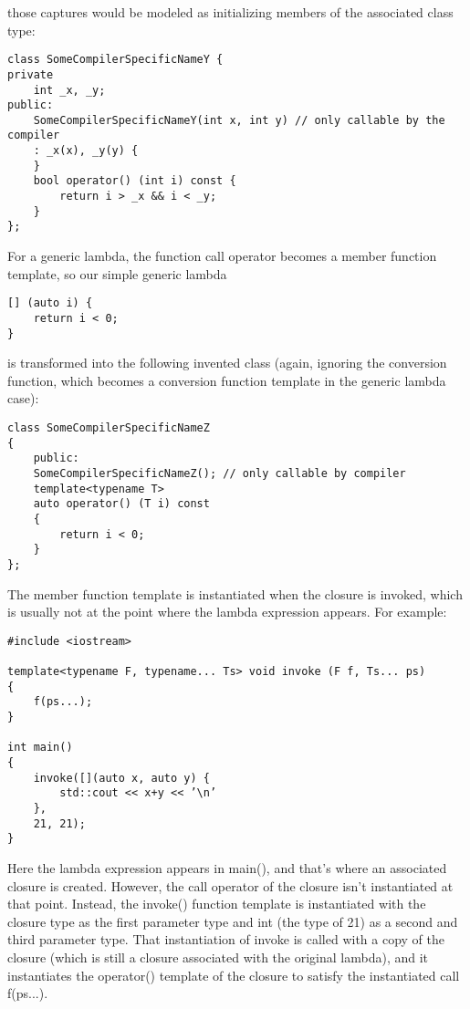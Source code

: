 those captures would be modeled as initializing members of the associated class type:

\begin{lstlisting}[style=styleCXX]
class SomeCompilerSpecificNameY {
private
	int _x, _y;
public:
	SomeCompilerSpecificNameY(int x, int y) // only callable by the compiler
	: _x(x), _y(y) {
	}
	bool operator() (int i) const {
		return i > _x && i < _y;
	}
};
\end{lstlisting}

For a generic lambda, the function call operator becomes a member function template, so our simple generic lambda

\begin{lstlisting}[style=styleCXX]
[] (auto i) {
	return i < 0;
}
\end{lstlisting}

is transformed into the following invented class (again, ignoring the conversion function, which becomes a conversion function template in the generic lambda case):

\begin{lstlisting}[style=styleCXX]
class SomeCompilerSpecificNameZ
{
	public:
	SomeCompilerSpecificNameZ(); // only callable by compiler
	template<typename T>
	auto operator() (T i) const
	{
		return i < 0;
	}
};
\end{lstlisting}

The member function template is instantiated when the closure is invoked, which is usually not at the point where the lambda expression appears. For example:

\begin{lstlisting}[style=styleCXX]
#include <iostream>

template<typename F, typename... Ts> void invoke (F f, Ts... ps)
{
	f(ps...);
}

int main()
{
	invoke([](auto x, auto y) {
		std::cout << x+y << ’\n’
	},
	21, 21);
}
\end{lstlisting}

Here the lambda expression appears in main(), and that’s where an associated closure is created. However, the call operator of the closure isn’t instantiated at that point. Instead, the invoke() function template is instantiated with the closure type as the first parameter type and int (the type of 21) as a second and third parameter type. That instantiation of invoke is called with a copy of the closure (which is still a closure associated with the original lambda), and it instantiates the operator() template of the closure to satisfy the instantiated call f(ps...).












